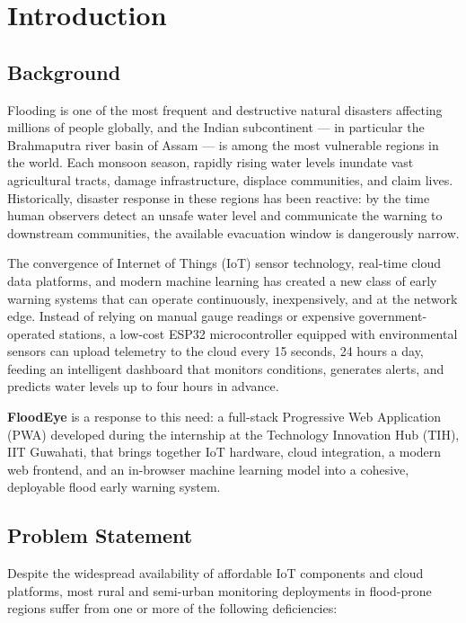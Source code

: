 ﻿%
\chapter{Introduction}

\section{Background}

Flooding is one of the most frequent and destructive natural disasters affecting millions of people globally, and the Indian subcontinent — in particular the Brahmaputra river basin of Assam — is among the most vulnerable regions in the world. Each monsoon season, rapidly rising water levels inundate vast agricultural tracts, damage infrastructure, displace communities, and claim lives. Historically, disaster response in these regions has been reactive: by the time human observers detect an unsafe water level and communicate the warning to downstream communities, the available evacuation window is dangerously narrow.

The convergence of Internet of Things (IoT) sensor technology, real-time cloud data platforms, and modern machine learning has created a new class of early warning systems that can operate continuously, inexpensively, and at the network edge. Instead of relying on manual gauge readings or expensive government-operated stations, a low-cost ESP32 microcontroller equipped with environmental sensors can upload telemetry to the cloud every 15 seconds, 24 hours a day, feeding an intelligent dashboard that monitors conditions, generates alerts, and predicts water levels up to four hours in advance.

\textbf{FloodEye} is a response to this need: a full-stack Progressive Web Application (PWA) developed during the internship at the Technology Innovation Hub (TIH), IIT Guwahati, that brings together IoT hardware, cloud integration, a modern web frontend, and an in-browser machine learning model into a cohesive, deployable flood early warning system.

\section{Problem Statement}

Despite the widespread availability of affordable IoT components and cloud platforms, most rural and semi-urban monitoring deployments in flood-prone regions suffer from one or more of the following deficiencies:


